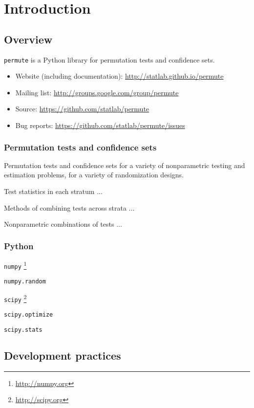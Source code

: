 \chapter{Introduction}

\section{Overview}

\texttt{permute} is a Python library for permutation tests and confidence sets.

\begin{itemize}
\item Website (including documentation): \url{http://statlab.github.io/permute}
\item Mailing list: \url{http://groups.google.com/group/permute}
\item Source: \url{https://github.com/statlab/permute}
\item Bug reports: \url{https://github.com/statlab/permute/issues}
\end{itemize}

\subsection{Permutation tests and confidence sets}

Permutation tests and confidence sets for a variety of nonparametric testing
and estimation problems, for a variety of randomization designs.
   
Test statistics in each stratum ...

Methods of combining tests across strata ...

Nonparametric combinations of tests ...

\subsection{Python}

\cite{millman2011python, Perez2011}

\texttt{numpy} \footnote{\url{http://numpy.org}}

\texttt{numpy.random}

\texttt{scipy} \footnote{\url{http://scipy.org}}

\texttt{scipy.optimize}

\texttt{scipy.stats}

\section{Development practices}

